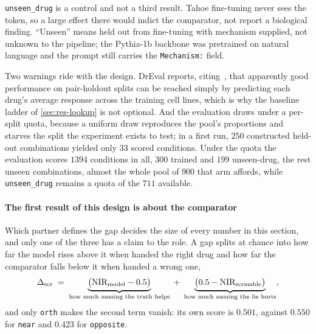 \texttt{unseen\_drug} is a control and not a third result. Tahoe fine-tuning
never sees the token, so a large effect there would indict the comparator, not
report a biological finding. ``Unseen'' means held out from fine-tuning with
mechanism supplied, not unknown to the pipeline; the Pythia-1b backbone was
pretrained on natural language and the prompt still carries the
\texttt{Mechanism:} field.

Two warnings ride with the design. DrEval reports, citing~\cite{partin}, that
apparently good performance on pair-holdout splits can be reached simply by
predicting each drug's average response across the training cell lines, which is
why the baseline ladder of \cref{sec:res-lookup} is not optional. And the
evaluation draws under a per-split quota, because a uniform draw reproduces the
pool's proportions and starves the split the experiment exists to test; in a
first run,
$\num{250}$ constructed held-out combinations yielded only $\num{33}$ scored
conditions. Under the quota the evaluation scores $\num{1394}$ conditions in all,
$\num{300}$ trained and $\num{199}$ unseen-drug, the rest unseen combinations,
almost the whole pool of $\num{900}$ that arm affords, while
\texttt{unseen\_drug} remains a quota of the $\num{711}$ available.

\paragraph{The first result of this design is about the comparator} Which partner
defines the gap decides the size of every number in this section, and only one of
the three has a claim to the role. A gap splits at chance into how far the model
rises above it when handed the right drug and how far the comparator falls below
it when handed a wrong one,
\begin{equation}
 \Delta_{\textrm{scr}} \;=\; \underbrace{\big(\textrm{NIR}_{\textrm{model}} - 0.5\big)}_{\textrm{how much naming the truth helps}}
 \;+\; \underbrace{\big(0.5 - \textrm{NIR}_{\textrm{scramble}}\big)}_{\textrm{how much naming the lie hurts}},
\end{equation}
and only \texttt{orth} makes the second term vanish: its own score is $0.501$,
against $0.550$ for \texttt{near} and $0.423$ for \texttt{opposite}.

